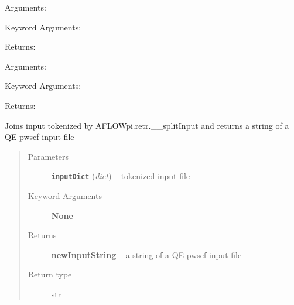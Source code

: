 \documentclass[letterpaper,10pt,english]{sphinxmanual}
\begin{document}

\begin{fulllineitems}
\label{retr:retr.__invertY}
Arguments:

Keyword Arguments:

Returns:

\end{fulllineitems}


\begin{fulllineitems}
\label{retr:retr.__invertZ}
Arguments:

Keyword Arguments:

Returns:

\end{fulllineitems}


\begin{fulllineitems}
\label{retr:retr.__joinInput}
Joins input tokenized by AFLOWpi.retr.\_\_splitInput and returns a string of a QE pwscf input file
\begin{quote}\begin{description}
\item[{Parameters}] \leavevmode
\textbf{\texttt{inputDict}} (\emph{dict}) -- tokenized input file

\item[{Keyword Arguments}] \leavevmode
\textbf{None}

\item[{Returns}] \leavevmode
\textbf{newInputString} --
a string of a QE pwscf input file

\item[{Return type}] \leavevmode
str

\end{description}\end{quote}

\end{fulllineitems}

\end{document}
